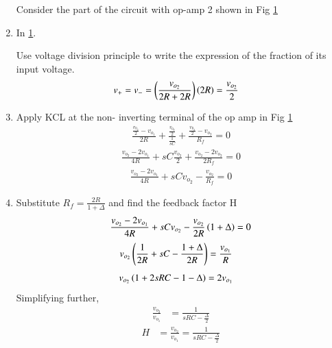 \begin{enumerate}[label=\arabic*.,ref=\theenumi]
Consider the part of the circuit with op-amp 2 shown in Fig \ref{fig:es17btech11009_fig3}
\renewcommand{\thefigure}{\theenumi.\arabic{figure}}
\begin{figure}[!ht]
	\begin{center}
		\resizebox{\columnwidth}{!}{}
	\end{center}
\caption{}
\label{fig:es17btech11009_fig3}
\end{figure}

\item
In \ref{fig:es17btech11009_fig3}.

Use voltage division principle to write the expression of the fraction of its input voltage.
\begin{align}
v_{+}&= v_{-}=\left(\frac{v_{o_2}}{2R + 2R}\right)\left(2R\right) = \frac{v_{o_2}}{2}
\end{align}
\item
Apply KCL at the non- inverting terminal of the op amp in Fig \ref{fig:es17btech11009_fig3}
\begin{align}
\frac{\frac{v_{0_2}}{2} - v_{o_1}}{2R} + \frac{\frac{v_{0_2}}{2}}{\frac{1}{sC}} + \frac{\frac{v_{0_2}}{2} - v_{o_2}}{R_{f}} =0
\end{align}
\begin{align}
\frac{v_{o_2} - 2v_{o_1}}{4R} + sC\frac{v_{o_2}}{2} + \frac{v_{o_2} - 2v_{o_2}}{2R_{f}} = 0
\end{align}
\begin{align}
\frac{v_{o_2} - 2v_{o_1}}{4R} + sCv_{o_2} -  \frac{v_{o_2}}{R_{f}} = 0
\end{align}
\item
Substitute $R_{f} = \frac{2R}{1 + \Delta}$ and find the feedback factor H
\begin{align}
\frac{v_{o_2} - 2v_{o_1}}{4R} + sCv_{o_2} -  \frac{v_{o_2}}{2R}\left(1 + \Delta\right) = 0
\end{align}
\begin{align}
v_{o_2}\left(\frac{1}{2R} + sC - \frac{1+ \Delta}{2R}\right)&= \frac{v_{o_1}}{R} 
\end{align}
\begin{align}
v_{o_2}\left(1 + 2sRC -1 - \Delta\right)&= 2v_{o_1}
\end{align}
Simplifying further,
\begin{align}
    \frac{v_{o_2}}{v_{o_1}}&= \frac{1}{sRC - \frac{\Delta}{2}}
\end{align}
\begin{align}
    H &=\frac{v_{o_2}}{v_{o_1}}= \frac{1}{sRC - \frac{\Delta}{2}}
    \label{eq:es17btech11009_H}
\end{align}


\end{enumerate}
